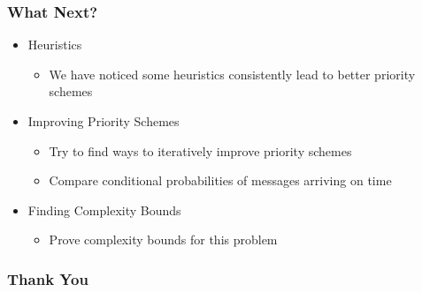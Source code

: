 \documentclass{beamer}
\begin{document}
\begin{frame}
\frametitle{What Next?}
	\begin{itemize}
	\item Heuristics
		\begin{itemize}
		\item We have noticed some heuristics consistently lead to better priority schemes
		\end{itemize}
	\item Improving Priority Schemes
		\begin{itemize}
		\item Try to find ways to iteratively improve priority schemes
		\item Compare conditional probabilities of messages arriving on time
		\end{itemize}
	\item Finding Complexity Bounds
		\begin{itemize}
		\item Prove complexity bounds for this problem
		\end{itemize}
	\end{itemize}
\end{frame}


\begin{frame}
\frametitle{Thank You}
\end{frame}
\end{document}

